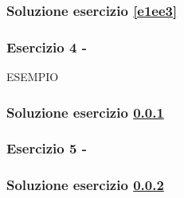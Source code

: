 \documentclass[../main.tex]{subfiles}
\begin{document}
\subsubsection*{Soluzione esercizio \ref{e1ee3}}

\vspace*{1.5cm}
\subsubsection{Esercizio 4 - }
\label{e1ee4}

ESEMPIO

\subsubsection*{Soluzione esercizio \ref{e1ee4}}

\vspace*{1.5cm}
\subsubsection{Esercizio 5 - }
\label{e1ee5}

\subsubsection*{Soluzione esercizio \ref{e1ee5}}
\end{document}
